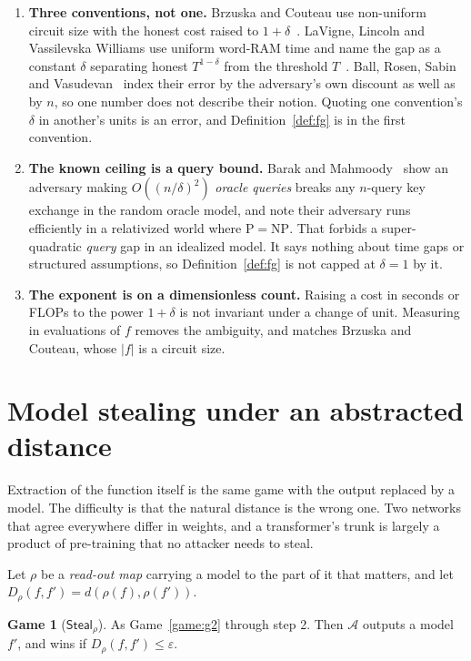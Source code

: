 \documentclass[11pt]{article}
\theoremstyle{definition}
\newtheorem{game}{Game}
\theoremstyle{plain}
\newcommand{\A}{\mathcal{A}}
\begin{document}
\begin{enumerate}
  \item \textbf{Three conventions, not one.} Brzuska and Couteau use non-uniform
        circuit size with the honest cost raised to $1+\delta$~\cite{BC22}.
        LaVigne, Lincoln and Vassilevska Williams use uniform word-RAM time and
        name the gap as a constant $\delta$ separating honest $T^{1-\delta}$ from
        the threshold $T$~\cite{LLW19}. Ball, Rosen, Sabin and
        Vasudevan~\cite{BRSV17} index their error by the adversary's own discount
        as well as by $n$, so one number does not describe their notion. Quoting
        one convention's $\delta$ in another's units is an error, and
        Definition~\ref{def:fg} is in the first convention.
  \item \textbf{The known ceiling is a query bound.} Barak and
        Mahmoody~\cite{BM09} show an adversary making $O((n/\delta)^2)$
        \emph{oracle queries} breaks any $n$-query key exchange in the random
        oracle model, and note their adversary runs efficiently in a relativized
        world where $\mathrm{P} = \mathrm{NP}$. That forbids a super-quadratic
        \emph{query} gap in an idealized model. It says nothing about time gaps or
        structured assumptions, so Definition~\ref{def:fg} is not capped at
        $\delta = 1$ by it.
  \item \textbf{The exponent is on a dimensionless count.} Raising a cost in
        seconds or FLOPs to the power $1+\delta$ is not invariant under a change of
        unit. Measuring in evaluations of $f$ removes the ambiguity, and matches
        Brzuska and Couteau, whose $|f|$ is a circuit size.
\end{enumerate}

\section{Model stealing under an abstracted distance}
\label{sec:steal}

Extraction of the function itself is the same game with the output replaced by a
model. The difficulty is that the natural distance is the wrong one. Two networks
that agree everywhere differ in weights, and a transformer's trunk is largely a
product of pre-training that no attacker needs to steal.

Let $\rho$ be a \emph{read-out map} carrying a model to the part of it that
matters, and let $D_\rho(f,f') = d(\rho(f), \rho(f'))$.

\begin{game}[$\mathsf{Steal}_\rho$]
\label{game:steal}
As Game~\ref{game:g2} through step 2. Then $\A$ outputs a model $f'$, and wins if
$D_\rho(f, f') \le \varepsilon$.
\end{game}
\end{document}
